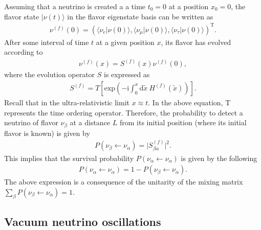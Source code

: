 \documentclass[twocolumn,secnumarabic,amssymb, nobibnotes, aps, prd,10pt]{revtex4-1}
\newcommand{\kt}[1]{\vert #1 \rangle}
\newcommand{\bt}[2]{\langle #1 \vert #2 \rangle}
\begin{document}
Assuming that a neutrino is created a a time $t_0 = 0$ at a position $x_0 = 0$, the flavor
state $\kt{\nu (t)}$ in the flavor eigenstate basis can be written as 
\begin{align}
\nu^{(f)} (0) = \left( \bt{\nu_e}{\nu(0)}, \bt{\nu_\mu}{\nu(0)}, \bt{\nu_\tau}{\nu(0)}
\right)^\mathrm{T}.
\end{align}
After some interval of time $t$ at a given position $x$, its flavor has evolved  according to
\begin{align}
\nu^{(f)} (x) = S^{(f)} (x) \nu^{(f)}(0),
\end{align}
where the evolution operator $S$ is expressed as
\begin{align}
S^{(f)} = T \left[ \mathrm{exp} \left( - \mathrm{i} \int_{0}^{x} \mathrm{d}\tilde{x} \:
H^{(f)} (\tilde{x}) \right) \right].
\end{align}
Recall that in the ultra-relativistic limit $x \approx t$. In the above equation, 
$\mathrm{T}$ represents the time ordering operator. Therefore, the probability to detect 
a neutrino of flavor $\nu_\beta$ at a distance $L$ from its initial position (where its 
initial flavor is known) is given by
\begin{align}
P (\nu_\beta \longleftarrow \nu_\alpha) = \vert S^{(f)}_{\beta \alpha} \vert^2.
\label{eq:prob_s}
\end{align}
This implies that the survival probability $P (\nu_\alpha \longleftarrow \nu_\alpha)$
is given by the following
\begin{align}
P (\nu_\alpha \longleftarrow \nu_\alpha) = 1 - P (\nu_\beta \longleftarrow \nu_\alpha).
\end{align}
The above expression is a consequence of the unitarity of the mixing matrix 
$\sum_\beta P (\nu_\beta \longleftarrow \nu_\alpha) = 1$.


\subsection{Vacuum neutrino oscillations}
\label{subsec:2neutrinoOsc}
\end{document}
